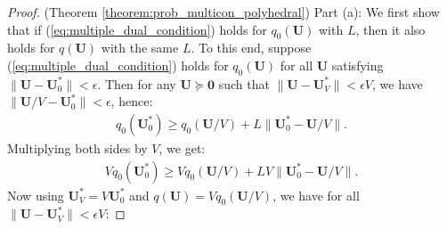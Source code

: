 \documentclass[journal]{IEEEtran}
\newcommand{\bv}[1]{{\boldsymbol{#1} }}
\begin{document}

\begin{proof} (Theorem \ref{theorem:prob_multicon_polyhedral})
Part (a): We first show that if (\ref{eq:multiple_dual_condition}) holds for $q_0(\bv{U})$ with $L$, then it also holds for $q(\bv{U})$ with the same $L$. To this end, suppose  (\ref{eq:multiple_dual_condition})  holds for $q_0(\bv{U})$ for all $\bv{U}$ satisfying $\|\bv{U}-\bv{U}^*_0\|<\epsilon$. Then for any $\bv{U}\succeq\bv{0}$ such that $\|\bv{U}-\bv{U}^*_V\|<\epsilon V$, we have $\|\bv{U}/V-\bv{U}^*_0\|<\epsilon$, hence:
\begin{eqnarray*}
q_0(\bv{U}^*_0)\geq q_0(\bv{U}/V)+L\|\bv{U}^*_0-\bv{U}/V\|.
\end{eqnarray*}
Multiplying both sides by $V$, we get:
\begin{eqnarray*}
Vq_0(\bv{U}^*_0)\geq Vq_0(\bv{U}/V)+LV\|\bv{U}^*_0-\bv{U}/V\|.
\end{eqnarray*}
Now using $\bv{U}^*_V=V\bv{U}^*_0$ and $q(\bv{U})=Vq_0(\bv{U}/V)$, we have for all $\|\bv{U}-\bv{U}^*_V\|<\epsilon V$:
 

\end{proof}
\end{document}
